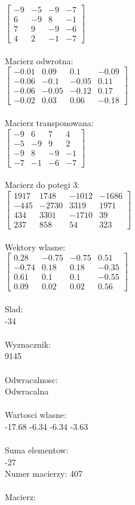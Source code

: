 \documentclass[a4paper,12pt]{article}
\begin{document}
$\begin{bmatrix} -9&-5&-9&-7\\6&-9&8&-1\\7&9&-9&-6\\4&2&-1&-7 \end{bmatrix}$
\\
\\
Macierz odwrotna:\\

$\begin{bmatrix} -0.01&0.09&0.1&-0.09\\-0.06&-0.1&-0.05&0.11\\-0.06&-0.05&-0.12&0.17\\-0.02&0.03&0.06&-0.18 \end{bmatrix}$
\\
\\
Macierz transponowana:\\

$\begin{bmatrix} -9&6&7&4\\-5&-9&9&2\\-9&8&-9&-1\\-7&-1&-6&-7 \end{bmatrix}$
\\
\\
Macierz do potegi 3:\\

$\begin{bmatrix} 1917&1748&-1012&-1686\\-445&-2730&3319&1971\\434&3301&-1710&39\\237&858&54&323 \end{bmatrix}$
\\
\\
Wektory wlasne:\\

$\begin{bmatrix} 0.28&-0.75&-0.75&0.51\\-0.74&0.18&0.18&-0.35\\0.61&0.1&0.1&-0.55\\0.09&0.02&0.02&0.56 \end{bmatrix}$
\\
\\
Slad:\\
-34
\\
\\
Wyznacznik:\\
9145
\\
\\
Odwracalnosc:\\
Odwracalna
\\
\\
Wartosci wlasne:\\
-17.68 -6.34 -6.34 -3.63
\\
\\
Suma elementow:\\
-27
\\
\newpage
Numer macierzy:
407
\\
\\
Macierz:\\
\end{document}
